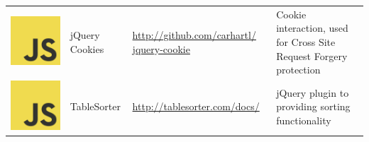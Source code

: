 \documentclass[12pt, a4paper]{article}
\begin{document}
\begin{table}[H]
{\begin{tabular}{|m{0.3cm}m{2.4cm}m{5.6cm}m{8.8cm}|}
\includegraphics[scale=0.02]{js.png}& jQuery Cookies & \href{http://github.com/carhartl/jquery-cookie}{http://github.com/carhartl/ jquery-cookie} & Cookie interaction, used for Cross Site Request Forgery protection \\
\includegraphics[scale=0.02]{js.png}& TableSorter & \href{http://tablesorter.com/docs/}{http://tablesorter.com/docs/} & jQuery plugin to providing sorting functionality \\

\end{tabular}}
\end{table}
\end{document}
